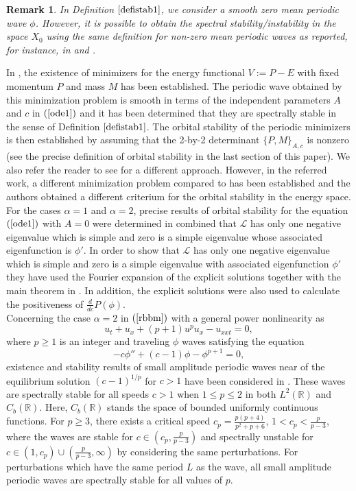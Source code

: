 \documentclass[12pt,reqno]{amsart}
\newcommand{\2}{L^2_{per}(0, T)}
\numberwithin{equation}{section}
\numberwithin{figure}{section}
\newtheorem{remark}[theorem]{Remark}
\begin{document}
\begin{remark}
	In Definition $\ref{defistab1}$, we consider a smooth zero mean periodic wave $\phi$. However, it is possible to obtain the spectral stability/instability in the space $X_0$ using the same definition for non-zero mean periodic waves as reported, for instance, in \cite{DK} and \cite{hur}.
\end{remark}
\indent In  \cite{hur}, the existence of minimizers for the energy functional $V:=P-E$ with fixed momentum $P$ and mass $M$ has been established. The periodic wave obtained by this minimization problem is smooth in terms of the independent parameters $A$ and $c$ in $(\ref{ode1})$ and it has been determined that they are spectrally stable in the sense of Definition $\ref{defistab1}$. The orbital stability of the periodic minimizers is then established by assuming that the 2-by-2 determinant $\{P,M\}_{A,c}$ is nonzero (see the precise definition of orbital stability in the last section of this paper). We also refer the reader to see \cite{CNP} for a different approach. However, in the referred work, a different minimization problem compared to \cite{hur} has been established and the authors obtained a different criterium for the orbital stability in the energy space.\\
\indent For the cases $\alpha=1$ and $\alpha=2$, precise results of orbital stability for the equation $(\ref{ode1})$ with $A=0$ were determined in \cite{an-ban-scia1} combined that $\mathcal{L}$ has only one negative eigenvalue which is simple and zero is a simple eigenvalue whose associated eigenfunction is $\phi'$. In order to show that $\mathcal{L}$ has only one negative eigenvalue which is simple and zero is a simple eigenvalue with associated eigenfunction $\phi'$ they have used the Fourier expansion of the explicit solutions together with the main theorem in \cite{natali}.
In addition, the explicit solutions were also used to calculate the positiveness of $\frac{d}{dc}P(\phi)$.\\
\indent Concerning the case $\alpha=2$ in $(\ref{rbbm})$ with a general power nonlinearity as
\begin{equation}\label{pBBM}
	u_t+u_x+(p+1)u^pu_x-u_{xxt}=0,
\end{equation}
where $p\geq1$ is an integer and traveling $\phi$ waves satisfying the equation
\begin{equation}\label{pBBM1}
	-c\phi''+(c-1)\phi-\phi^{p+1}=0,
\end{equation}
existence and stability results of small amplitude periodic waves near of the equilibrium solution $(c-1)^{1/p}$ for $c>1$ have been considered in \cite{haragus}. These waves are spectrally stable for all speeds $c>1$ when $1\leq p \leq 2$ in both $L^2(\mathbb{R})$ and $C_{b}(\mathbb{R})$. Here, $C_{b}(\mathbb{R})$ stands the space of bounded uniformly continuous functions. For $p\geq3$, there exists a critical speed $c_p=\frac{p(p+4)}{p^2+p+6}$, $1<c_p<\frac{p}{p-3}$, where the waves are stable for $c\in \left(c_p,\frac{p}{p-3}\right)$ and spectrally unstable for $c\in (1,c_p)\cup \left(\frac{p}{p-3},\infty\right)$ by considering the same perturbations. For perturbations which have the same period $L$ as the wave, all small amplitude periodic waves are spectrally stable for all values of $p$.\\
\end{document}
